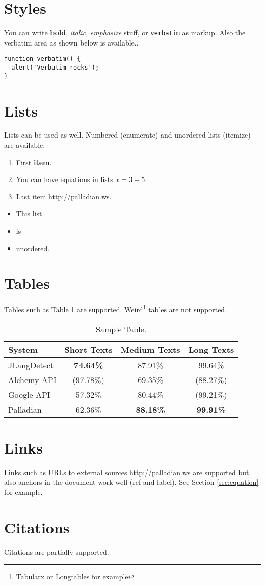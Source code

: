 \section{Styles}
You can write \textbf{bold}, \textit{italic}, \emph{emphasize} stuff, or \verb#verbatim# as markup. Also the verbatim area as shown below is available..

\begin{verbatim}
function verbatim() {
  alert('Verbatim rocks');
}
\end{verbatim}

\section{Lists}
Lists can be used as well. Numbered (enumerate) and unordered lists (itemize) are available.

\begin{enumerate}
\item First \textbf{item}.
\item You can have equations in lists $x = 3 + 5$.
\item Last item \url{http://palladian.ws}.
\end{enumerate} 

\begin{itemize}
\item This list
\item is
\item unordered.
\end{itemize} 

\section{Tables}
Tables such as Table \ref{tab:sampleTable} are supported. Weird\footnote{Tabularx or Longtables for example} tables are not supported.

\begin{table}
\centering
\begin{tabular}{|l|c|c|c|}
	\hline
	System & Short Texts & Medium Texts & Long Texts \\ 
	\hline
	JLangDetect & \textbf{74.64\%} & 87.91\% & 99.64\% \\ 
	\hline
	Alchemy API & (97.78\%) & 69.35\% & (88.27\%) \\ 
	\hline
	Google API & 57.32\% & 80.44\% & (99.21\%) \\ 
	\hline
	Palladian & 62.36\% & \textbf{88.18\%} & \textbf{99.91\%}  \\ 
	\hline
\end{tabular}
\caption{Sample Table.}
\label{tab:sampleTable}
\end{table}

\section{Links}
Links such as URLs to external sources \url{http://palladian.ws} are supported but also anchors in the document work well (ref and label). See Section \ref{sec:equation} for example.

\section{Citations}
Citations \cite{palladian2012} are partially supported.